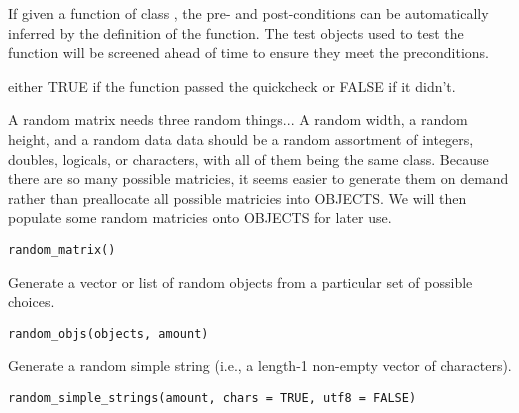 \documentclass[a4paper]{book}
\begin{document}
%
\begin{Details}\relax
If given a function of class , the pre- and post-conditions can
be automatically inferred by the definition of the function. The test objects used to
test the function will be screened ahead of time to ensure they meet the preconditions.
\end{Details}
%
\begin{Value}
either TRUE if the function passed the quickcheck or FALSE if it didn't.
\end{Value}
%
\begin{Description}\relax
A random matrix needs three random things...
A random width, a random height, and a random data
data should be a random assortment of integers, doubles, logicals, or characters, with
all of them being the same class.
Because there are so many possible matricies, it seems easier to generate them on
demand rather than preallocate all possible matricies into OBJECTS.
We will then populate some random matricies onto OBJECTS for later use.
\end{Description}
%
\begin{Usage}
\begin{verbatim}
random_matrix()
\end{verbatim}
\end{Usage}
%
\begin{Description}\relax
Generate a vector or list of random objects from a particular set of possible choices.
\end{Description}
%
\begin{Usage}
\begin{verbatim}
random_objs(objects, amount)
\end{verbatim}
\end{Usage}
%
\begin{Description}\relax
Generate a random simple string (i.e., a length-1 non-empty vector of characters).
\end{Description}
%
\begin{Usage}
\begin{verbatim}
random_simple_strings(amount, chars = TRUE, utf8 = FALSE)
\end{verbatim}
\end{Usage}
\end{document}

